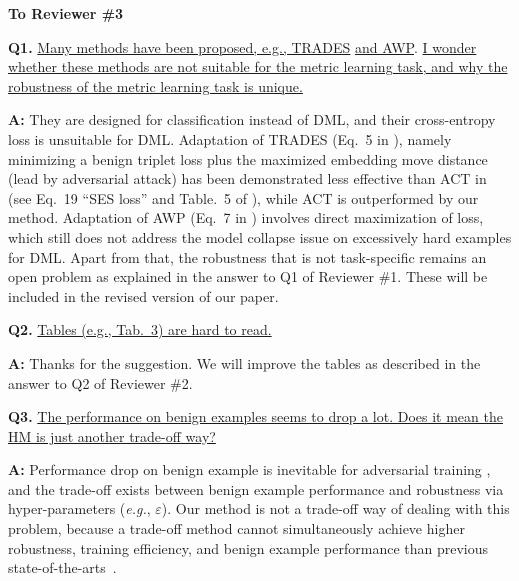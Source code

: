 \documentclass[10pt,twocolumn,letterpaper]{article}
\begin{document}
\vspace{0.3em}
\noindent\textbf{To Reviewer \#3}
\vspace{0.2em}

\noindent\textbf{Q1.}
%
\ul{Many methods have been proposed, e.g., TRADES}\cite{trades} \ul{and
AWP}\cite{awp}.  \ul{I wonder whether these methods are not suitable for the
metric learning task, and why the robustness of the metric learning task is
unique.}

\noindent\textbf{A:}
%
They are designed for classification instead of DML, and their cross-entropy
loss is unsuitable for DML.
%
Adaptation of TRADES (Eq.~5 in \cite{trades}), namely minimizing a benign
triplet loss plus the maximized embedding move distance (lead by adversarial
attack) has been demonstrated less effective than ACT in \cite{robrank} (see
Eq.~19 ``SES loss'' and Table.~5 of \cite{robrank}), while ACT is outperformed
by our method.
%
Adaptation of AWP (Eq.~7 in \cite{awp}) involves direct maximization
of loss, which still does not address the model collapse issue on
excessively hard examples for DML.
%
Apart from that, the robustness that is not task-specific remains an open
problem as explained in the answer to Q1 of Reviewer \#1.
%
These will be included in the revised version of our paper.


\noindent\textbf{Q2.}
%
\ul{Tables (e.g., Tab.~3) are hard to read.}

\noindent\textbf{A:} Thanks for the suggestion. We will improve the tables as described in the answer to Q2 of Reviewer \#2.

\noindent\textbf{Q3.}
%
\ul{The performance on benign examples seems to drop a lot. Does it mean the
HM is just another trade-off way?}

\noindent\textbf{A:}
%
Performance drop on benign example is inevitable for adversarial training
\cite{madry,trades,awp,advrank,robrank}, and the trade-off exists
between benign example performance and robustness via hyper-parameters
(\emph{e.g.}, $\varepsilon$).
%
Our method is not a trade-off way of dealing with this problem, because a trade-off method cannot
simultaneously achieve higher robustness, training efficiency, and benign
example performance than previous state-of-the-arts~\cite{advrank,robrank}.


{\small
\renewcommand{\section}[2]{}%


}
\end{document}
